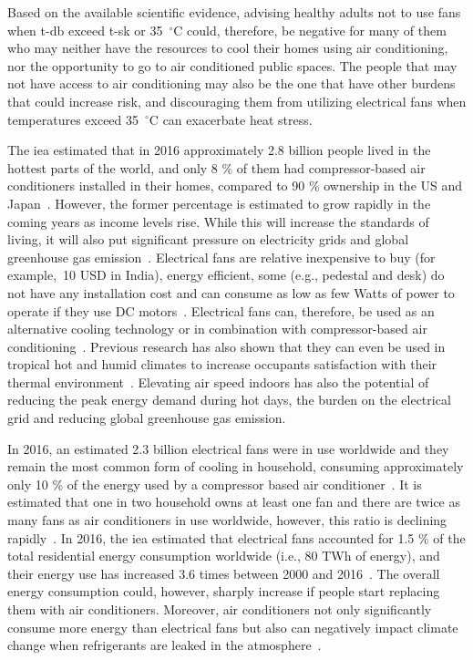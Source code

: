 Based on the available scientific evidence, advising healthy adults not to use fans when \ac{t-db} exceed \ac{t-sk} or 35~$^{\circ}$C could, therefore, be negative for many of them who may neither have the resources to cool their homes using air conditioning, nor the opportunity to go to air conditioned public spaces.
The people that may not have access to air conditioning may also be the one that have other burdens that could increase risk, and discouraging them from utilizing electrical fans when temperatures exceed 35~$^{\circ}$C can exacerbate heat stress.

The \ac{iea} estimated that in 2016 approximately 2.8 billion people lived in the hottest parts of the world, and only 8 \% of them had compressor-based air conditioners installed in their homes, compared to 90 \% ownership in the US and Japan~\cite{IEA2018}.
However, the former percentage is estimated to grow rapidly in the coming years as income levels rise.
While this will increase the standards of living, it will also put significant pressure on electricity grids and global greenhouse gas emission~\cite{IEA2018}.
Electrical fans are relative inexpensive to buy (for example,~10 USD in India), energy efficient, some (e.g., pedestal and desk) do not have any installation cost and can consume as low as few Watts of power to operate if they use DC motors~\cite{Yang2015a}.
Electrical fans can, therefore, be used as an alternative cooling technology or in combination with compressor-based air conditioning~\cite{Jay2019a, Hoyt2015, Schiavon2008}.
Previous research has also shown that they can even be used in tropical hot and humid climates to increase occupants satisfaction with their thermal environment~\cite{Lipczynska2018a}.
Elevating air speed indoors has also the potential of reducing the peak energy demand during hot days, the burden on the electrical grid and reducing global greenhouse gas emission.

In 2016, an estimated 2.3 billion electrical fans were in use worldwide and they remain the most common form of cooling in household, consuming approximately only 10 \% of the energy used by a compressor based air conditioner~\cite{IEA2018}.
It is estimated that one in two household owns at least one fan and there are twice as many fans as air conditioners in use worldwide, however, this ratio is declining rapidly~\cite{IEA2018}.
In 2016, the \ac{iea} estimated that electrical fans accounted for 1.5 \% of the total residential energy consumption worldwide (i.e., 80 TWh of energy), and their energy use has increased 3.6 times between 2000 and 2016~\cite{IEA2018}.
The overall energy consumption could, however, sharply increase if people start replacing them with air conditioners.
Moreover, air conditioners not only significantly consume more energy than electrical fans but also can negatively impact climate change when refrigerants are leaked in the atmosphere~\cite{IEA2018}.

